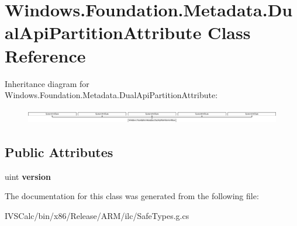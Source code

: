 \hypertarget{class_windows_1_1_foundation_1_1_metadata_1_1_dual_api_partition_attribute}{}\section{Windows.\+Foundation.\+Metadata.\+Dual\+Api\+Partition\+Attribute Class Reference}
\label{class_windows_1_1_foundation_1_1_metadata_1_1_dual_api_partition_attribute}
Inheritance diagram for Windows.\+Foundation.\+Metadata.\+Dual\+Api\+Partition\+Attribute\+:\begin{figure}[H]
\begin{center}
\leavevmode
\includegraphics[height=0.668657cm]{class_windows_1_1_foundation_1_1_metadata_1_1_dual_api_partition_attribute}
\end{center}
\end{figure}
\subsection*{Public Attributes}
\begin{DoxyCompactItemize}
\item 
\mbox{\label{class_windows_1_1_foundation_1_1_metadata_1_1_dual_api_partition_attribute_a034310f1363fdf5a6598df620d07bd2f}} 
uint {\bfseries version}
\end{DoxyCompactItemize}


The documentation for this class was generated from the following file\+:\begin{DoxyCompactItemize}
\item 
I\+V\+S\+Calc/bin/x86/\+Release/\+A\+R\+M/ilc/Safe\+Types.\+g.\+cs\end{DoxyCompactItemize}

